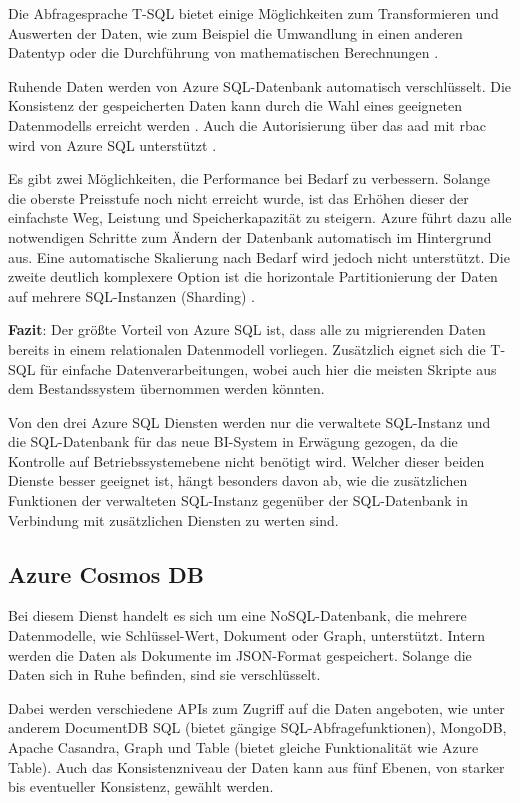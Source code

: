 Die Abfragesprache T-SQL bietet einige Möglichkeiten zum Transformieren und Auswerten der Daten, wie zum Beispiel die Umwandlung in einen anderen Datentyp oder die Durchführung von mathematischen Berechnungen \cite[vgl.][]{kellenberger_beginning_2021}.

Ruhende Daten werden von Azure SQL-Datenbank automatisch verschlüsselt. Die Konsistenz der gespeicherten Daten kann durch die Wahl eines geeigneten Datenmodells erreicht werden \cite{reagan_web_2018}. Auch die Autorisierung über das \ac{aad} mit \ac{rbac} wird von Azure SQL unterstützt \cite{wolter_authorize_2021}.

Es gibt zwei Möglichkeiten, die Performance bei Bedarf zu verbessern. Solange die oberste Preisstufe noch nicht erreicht wurde, ist das Erhöhen dieser der einfachste Weg, Leistung und Speicherkapazität zu steigern. Azure führt dazu alle notwendigen Schritte zum Ändern der Datenbank automatisch im Hintergrund aus. Eine automatische Skalierung nach Bedarf wird jedoch nicht unterstützt. Die zweite deutlich komplexere Option ist die horizontale Partitionierung der Daten auf mehrere SQL-Instanzen (Sharding) \cite{reagan_web_2018}.

\textbf{Fazit}: Der größte Vorteil von Azure SQL ist, dass alle zu migrierenden Daten bereits in einem relationalen Datenmodell vorliegen. Zusätzlich eignet sich die T-SQL für einfache Datenverarbeitungen, wobei auch hier die meisten Skripte aus dem Bestandssystem übernommen werden könnten.

Von den drei Azure SQL Diensten werden nur die verwaltete SQL-Instanz und die SQL-Datenbank für das neue BI-System in Erwägung gezogen, da die Kontrolle auf Betriebssystemebene nicht benötigt wird. Welcher dieser beiden Dienste besser geeignet ist, hängt besonders davon ab, wie die zusätzlichen Funktionen der verwalteten SQL-Instanz gegenüber der SQL-Datenbank in Verbindung mit zusätzlichen Diensten zu werten sind. 

\subsection{Azure Cosmos DB} \label{sec:grundlagen:azure_dienste:cosmosDB}
Bei diesem Dienst handelt es sich um eine NoSQL-Datenbank, die mehrere Datenmodelle, wie Schlüssel-Wert, Dokument oder Graph, unterstützt. Intern werden die Daten als Dokumente im JSON-Format gespeichert. Solange die Daten sich in Ruhe befinden, sind sie verschlüsselt.

Dabei werden verschiedene APIs zum Zugriff auf die Daten angeboten, wie unter anderem DocumentDB SQL (bietet gängige SQL-Abfragefunktionen), MongoDB, Apache Casandra, Graph und Table (bietet gleiche Funktionalität wie Azure Table). Auch das Konsistenzniveau der Daten kann aus fünf Ebenen, von starker bis eventueller Konsistenz, gewählt werden.

